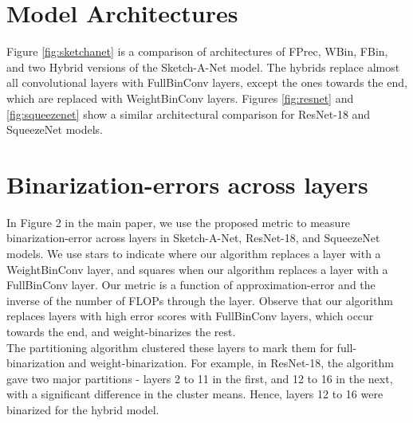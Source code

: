 \section{Model Architectures}
\noindent Figure \ref{fig:sketchanet} is a comparison of architectures of FPrec, WBin, FBin, and two Hybrid versions of the Sketch-A-Net model. The hybrids replace almost all convolutional layers with FullBinConv layers, except the ones towards the end, which are replaced with WeightBinConv layers. Figures \ref{fig:resnet} and \ref{fig:squeezenet} show a similar architectural comparison for ResNet-18 and SqueezeNet models.  

\section{Binarization-errors across layers }
In Figure 2 in the main paper, we use the proposed metric to measure binarization-error across layers in Sketch-A-Net, ResNet-18, and SqueezeNet models. We use stars to indicate where our algorithm replaces a layer with a WeightBinConv layer, and squares when our algorithm replaces a layer with a FullBinConv layer. Our metric is a function of approximation-error and the inverse of the number of FLOPs through the layer. Observe that our algorithm replaces layers with high error scores with FullBinConv layers, which occur towards the end, and weight-binarizes the rest. \\
The partitioning algorithm clustered these layers to mark them for full-binarization and weight-binarization. For example, in ResNet-18, the algorithm gave two major partitions - layers 2 to 11 in the first, and 12 to 16 in the next, with a significant difference in the cluster means. Hence, layers 12 to 16 were binarized for the hybrid model.




